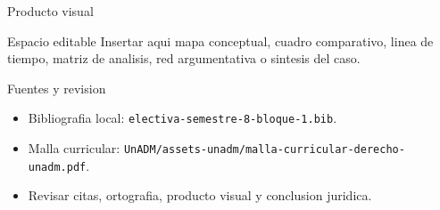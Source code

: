 \documentclass[
  spanish,
  aspectratio=169,
  xcolor={dvipsnames,table}
]{beamer}
\begin{document}
\begin{frame}{Producto visual}
  \begin{block}{Espacio editable}
    Insertar aqui mapa conceptual, cuadro comparativo, linea de tiempo,
    matriz de analisis, red argumentativa o sintesis del caso.
  \end{block}
  \centering
\end{frame}

\begin{frame}{Fuentes y revision}
  \begin{itemize}
    \item Bibliografia local: \texttt{electiva-semestre-8-bloque-1.bib}.
    \item Malla curricular: \texttt{UnADM/assets-unadm/malla-curricular-derecho-unadm.pdf}.
    \item Revisar citas, ortografia, producto visual y conclusion juridica.
  \end{itemize}
\end{frame}
\end{document}

